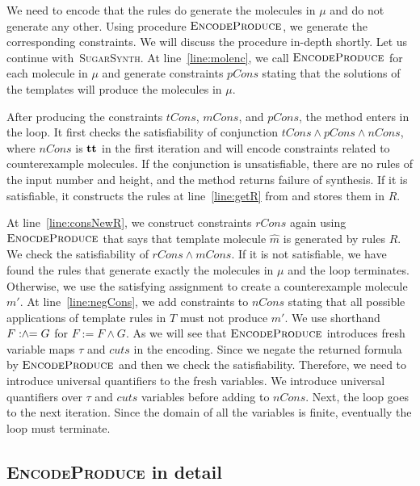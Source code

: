 We need to encode that the rules do generate the molecules
in $\mu$ and do not generate any other.
Using procedure $\textsc{EncodeProduce}$, we generate
the corresponding constraints.
We will discuss the procedure in-depth shortly.
Let us continue with~\textsc{SugarSynth}.
At line~\ref{line:molenc}, we call $\textsc{EncodeProduce}$ for
each molecule in $\mu$ and generate constraints $pCons$ stating that
the solutions of the templates will produce the molecules in $\mu$.

After producing the constraints $tCons$, $mCons$, and $pCons$,
the method enters in the loop.
It first checks the satisfiability of conjunction
$tCons \land pCons \land nCons$, where $nCons$ is $\mathbf{tt}$ in the first iteration
and will encode constraints related to counterexample molecules.
If the conjunction is unsatisfiable, there are no rules of
the input number and height,
and the method returns failure of synthesis.
If it is satisfiable, it constructs the rules at line~\ref{line:getR} from
and stores them in $R$.

At line~\ref{line:consNewR}, we construct constraints $rCons$ again using
$\textsc{EnocdeProduce}$ that says that template molecule $\hat{m}$
is generated by rules $R$.
We check the satisfiability of $rCons \land mCons$.
If it is not satisfiable, we have found the rules that generate exactly
the molecules in $\mu$ and the loop terminates.
Otherwise, we use the satisfying assignment to create a
counterexample molecule $m'$.
At line~\ref{line:negCons}, we add constraints to $nCons$ stating that
all possible applications of template rules in $T$ must not produce $m'$.
We use shorthand $F \mathrel{:\hspace{-3pt}\land\hspace{-3pt}=} G$ for $ F := F \land G$.
As we will see that $\textsc{EncodeProduce}$ introduces fresh variable
maps $\tau$ and $cuts$ in the encoding.
Since we negate the returned formula by $\textsc{EncodeProduce}$ 
and then we check the satisfiability.
Therefore, we need to introduce universal quantifiers to the
fresh variables.
We introduce universal quantifiers over $\tau$ and $cuts$
variables before adding to $nCons$.
Next, the loop goes to the next iteration.
Since the domain of all the variables is finite, eventually the loop must
terminate.



\subsection{\textsc{EncodeProduce} in detail}


